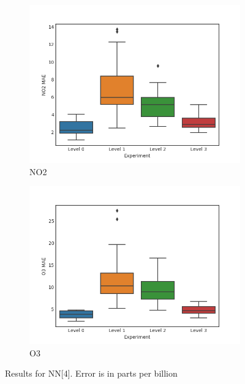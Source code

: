 \documentclass{article}
\begin{document}
\begin{figure}[H]
\centering
\begin{subfigure}{0.45\textwidth}
\includegraphics[width=\textwidth]{results/nn-4/no2.png}
\caption{NO2}
\end{subfigure}
\begin{subfigure}{0.45\textwidth}
\includegraphics[width=\textwidth]{results/nn-4/o3.png}
\caption{O3}
\end{subfigure}
\caption{Results for NN[4]. Error is in parts per billion}
\label{fig:results-nn4}
\end{figure}
\end{document}

